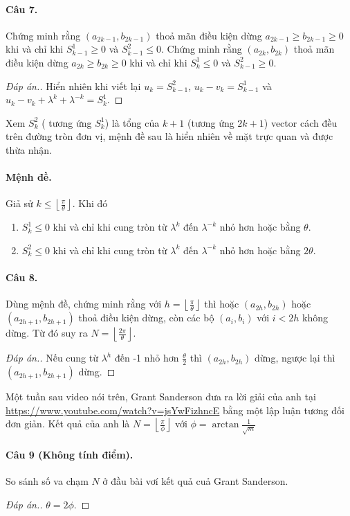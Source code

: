 \documentclass[11pt]{article}
\begin{document}
\paragraph{Câu 7.}
\label{sec:org8b3528c}
Chứng minh rằng \((a_{2k-1},b_{2k-1})\) thoả mãn điều kiện
dừng \(a_{2k-1}\geq b_{2k-1}\geq 0\) khi và chỉ khi \(S^1_{k-1} \geq 0\) và \(S^{2}_{k-1}\leq 0\). Chứng minh rằng \((a_{2k},b_{2k})\) thoả mãn điều kiện
dừng \(a_{2k}\geq b_{2k}\geq 0\) khi và chỉ khi \(S^1_{k} \leq 0\) và \(S^{2}_{k-1}\geq 0\).
\begin{proof}[Đáp án.]
Hiển nhiên khi viết lại \(u_k = S^2_{k-1}\), \(u_k-v_k = S^1_{k-1}\) và \(u_k-v_k +\lambda^k +\lambda^{-k} = S^1_{k}\).
\end{proof}

Xem \(S^2_k\) ( tương ứng \(S^1_k\)) là tổng của \(k+1\) (tương ứng \(2k+1\))
vector cách đều trên đường tròn đơn vị, mệnh đề sau là hiển nhiên về mặt trực quan và
được thừa nhận.

\paragraph*{Mệnh đề.}
\label{sec:org28d33d0}
Giả sử \(k\leq \left \lfloor \frac{\pi}{\theta} \right\rfloor\). Khi đó 
\begin{enumerate}
\item \(S^1_k \leq 0\) khi và chỉ khi cung tròn từ \(\lambda^k\) đến \(\lambda^{-k}\) nhỏ hơn hoặc bằng \(\theta\).
\item \(S^2_k \leq 0\) khi và chỉ khi cung tròn từ \(\lambda^k\) đến \(\lambda^{-k}\)
nhỏ hơn hoặc bằng \(2\theta\).
\end{enumerate}


\paragraph{Câu 8.}
\label{sec:orga1c47d8}
Dùng mệnh đề, chứng minh rằng với \(h =  \left \lfloor \frac{\pi}{\theta} \right\rfloor\) thì hoặc \((a_{2h}, b_{2h})\) hoặc \((a_{2h+1}, b_{2h+1})\) thoả điều kiện dừng,
còn các bộ \((a_i, b_i)\) với \(i < 2h\) không dừng. Từ đó suy ra \(N = \left \lfloor
\frac{2\pi}{\theta} \right \rfloor\).
\begin{proof}[Đáp án.]
Nếu cung từ \(\lambda^h\) đến -1 nhỏ hơn \(\frac{\theta}{2}\) thì \((a_{2h}, b_{2h})\) dừng, ngược lại thì \((a_{2h+1}, b_{2h+1})\) dừng.
\end{proof}

Một tuần sau video nói trên, Grant Sanderson đưa ra lời giải của anh tại
\url{https://www.youtube.com/watch?v=jsYwFizhncE} bằng một lập luận tương đối đơn giản. Kết quả của
anh là \(N = \left \lfloor \frac{\pi}{\phi} \right\rfloor\) với \(\phi = \arctan
\frac{1}{\sqrt{m}}\)

\paragraph{Câu 9 (Không tính điểm).}
\label{sec:org99e9f8f}
So sánh số va chạm \(N\) ở đầu bài vơí kết quả cuả Grant Sanderson.
\begin{proof}[Đáp án.]
\(\theta = 2\phi\).
\end{proof}
\end{document}
